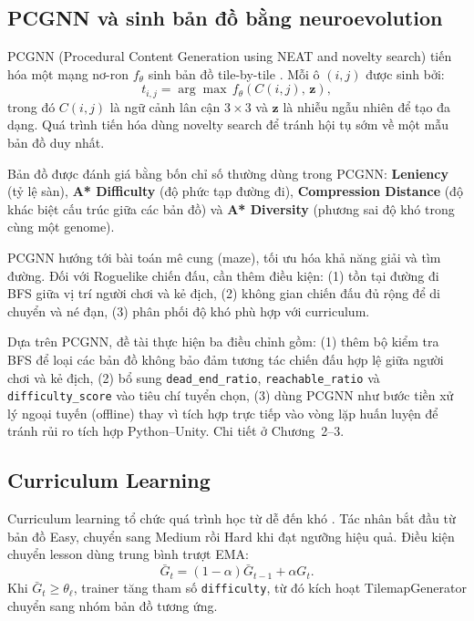 \subsection{PCGNN và sinh bản đồ bằng neuroevolution}

PCGNN (Procedural Content Generation using NEAT and novelty search) tiến hóa một mạng nơ-ron $f_\theta$ sinh bản đồ tile-by-tile \cite{Beukman2022}. Mỗi ô $(i,j)$ được sinh bởi:
\begin{equation}
    t_{i,j} = \arg\max\, f_\theta(C(i,j),\, \mathbf{z}),
\end{equation}
trong đó $C(i,j)$ là ngữ cảnh lân cận $3\times3$ và $\mathbf{z}$ là nhiễu ngẫu nhiên để tạo đa dạng. Quá trình tiến hóa dùng novelty search để tránh hội tụ sớm về một mẫu bản đồ duy nhất.

Bản đồ được đánh giá bằng bốn chỉ số thường dùng trong PCGNN: \textbf{Leniency} (tỷ lệ sàn), \textbf{A* Difficulty} (độ phức tạp đường đi), \textbf{Compression Distance} (độ khác biệt cấu trúc giữa các bản đồ) và \textbf{A* Diversity} (phương sai độ khó trong cùng một genome).

PCGNN hướng tới bài toán mê cung (maze), tối ưu hóa khả năng giải và tìm đường. Đối với Roguelike chiến đấu, cần thêm điều kiện: (1) tồn tại đường đi BFS giữa vị trí người chơi và kẻ địch, (2) không gian chiến đấu đủ rộng để di chuyển và né đạn, (3) phân phối độ khó phù hợp với curriculum.

Dựa trên PCGNN, đề tài thực hiện ba điều chỉnh gồm: (1) thêm bộ kiểm tra BFS để loại các bản đồ không bảo đảm tương tác chiến đấu hợp lệ giữa người chơi và kẻ địch, (2) bổ sung \texttt{dead\_end\_ratio}, \texttt{reachable\_ratio} và \texttt{difficulty\_score} vào tiêu chí tuyển chọn, (3) dùng PCGNN như bước tiền xử lý ngoại tuyến (offline) thay vì tích hợp trực tiếp vào vòng lặp huấn luyện để tránh rủi ro tích hợp Python--Unity. Chi tiết ở Chương~2--3.

\subsection{Curriculum Learning}

Curriculum learning tổ chức quá trình học từ dễ đến khó \cite{Bengio2009}. Tác nhân bắt đầu từ bản đồ Easy, chuyển sang Medium rồi Hard khi đạt ngưỡng hiệu quả. Điều kiện chuyển lesson dùng trung bình trượt EMA:
\begin{equation}
    \bar{G}_t = (1-\alpha)\bar{G}_{t-1} + \alpha G_t.
    \label{eq:curriculum_ema}
\end{equation}
Khi $\bar{G}_t \geq \theta_\ell$, trainer tăng tham số \texttt{difficulty}, từ đó kích hoạt TilemapGenerator chuyển sang nhóm bản đồ tương ứng.

